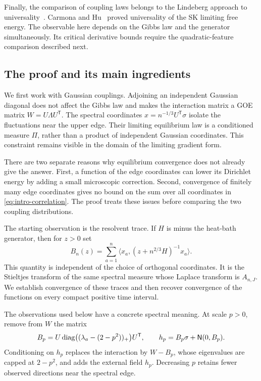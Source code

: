 Finally, the comparison of coupling laws belongs to the Lindeberg approach
to universality~\cite{Chatterjee2006}. Carmona and Hu~\cite{CarmonaHu2006}
proved universality of the SK limiting free energy. The observable here
depends on the Gibbs law and the generator simultaneously. Its critical
derivative bounds require the quadratic-feature comparison described next.

\subsection{The proof and its main ingredients}
We first work with Gaussian couplings. Adjoining an independent Gaussian
diagonal does not affect the Gibbs law and makes the interaction matrix a
GOE matrix $W=U\Lambda U^{\mathsf T}$. The spectral coordinates
$x=n^{-1/3}U^{\mathsf T}\sigma$ isolate the fluctuations near the upper edge.
Their limiting equilibrium law is a conditioned measure $\Pi$, rather than
a product of independent Gaussian coordinates. This constraint remains
visible in the domain of the limiting gradient form.

There are two separate reasons why equilibrium convergence does not already
give the answer. First, a function of the edge coordinates can lower its
Dirichlet energy by adding a small microscopic correction. Second, convergence
of finitely many edge coordinates gives no bound on the sum over all
coordinates in \eqref{eq:intro-correlation}. The proof treats these issues
before comparing the two coupling distributions.

The starting observation is the resolvent trace. If $H$ is minus the
heat-bath generator, then for $z>0$ set
\[
 B_n(z)=\sum_{a=1}^n
   \langle x_a,(z+n^{2/3}H)^{-1}x_a\rangle.
\]
This quantity is independent of the choice of orthogonal coordinates. It
is the Stieltjes transform of the same spectral measure whose Laplace
transform is $A_{n,J}$. We establish convergence of these traces and then
recover convergence of the functions on every compact positive time interval.

The observations used below have a concrete spectral meaning. At scale
$p>0$, remove from $W$ the matrix
\[
 B_p=U\operatorname{diag}\bigl((\lambda_a-(2-p^2))_+\bigr)U^{\mathsf T},
 \qquad h_p=B_p\sigma+\mathsf N(0,B_p).
\]
Conditioning on $h_p$ replaces the interaction by $W-B_p$, whose eigenvalues
are capped at $2-p^2$, and adds the external field $h_p$. Decreasing $p$
retains fewer observed directions near the spectral edge.


